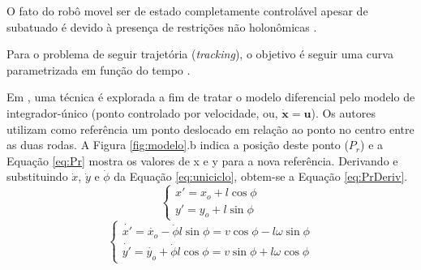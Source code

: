 O fato do robô movel ser de estado completamente controlável
apesar de subatuado é devido à presença de restrições não holonômicas
\cite{Oriolo2013}.

Para o problema de seguir trajetória (\textit{tracking}), o objetivo é seguir
uma curva parametrizada em função do tempo \cite{art:Manuel}. 

Em , uma técnica é explorada a fim de tratar o
modelo diferencial pelo modelo de integrador-único (ponto controlado por
velocidade, ou, $\mathbf{\dot{x}} = \mathbf{u}$). Os autores utilizam como
referência um ponto deslocado em relação ao ponto no centro entre as duas rodas.
A Figura \ref{fig:modelo}.b indica a posição deste ponto ($P_r$) e a Equação
\ref{eq:Pr} mostra os valores de x e y para a nova referência. Derivando e
substituindo $\dot{x}$, $\dot{y}$ e $\dot{\phi}$ da Equação \ref{eq:uniciclo},
obtem-se a Equação \ref{eq:PrDeriv}.
\begin{equation}
	\label{eq:Pr}
	\left \{ \begin{matrix} x' = x_o + l\cos{\phi}
	\\
	y' = y_o + l\sin{\phi}
	\end{matrix} \right.
\end{equation}
\begin{equation}
	\label{eq:PrDeriv}
	\left \{ \begin{matrix} \dot{x'} = \dot{x_o} - \dot{\phi}l\sin{\phi} =
	v\cos{\phi} - l\omega\sin{\phi}
	\\
	\dot{y'} = \dot{y_o} + \dot{\phi}l\cos{\phi} = v\sin{\phi} + l\omega\cos{\phi}
	\end{matrix} \right.
\end{equation}

